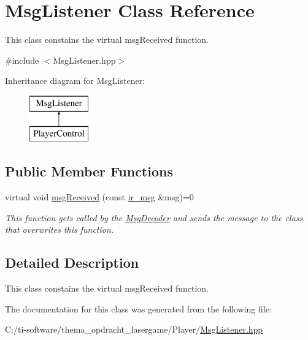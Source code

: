 \hypertarget{class_msg_listener}{}\section{Msg\+Listener Class Reference}
\label{class_msg_listener}


This class constains the virtual msg\+Received function.  




{\ttfamily \#include $<$Msg\+Listener.\+hpp$>$}

Inheritance diagram for Msg\+Listener\+:\begin{figure}[H]
\begin{center}
\leavevmode
\includegraphics[height=2.000000cm]{class_msg_listener}
\end{center}
\end{figure}
\subsection*{Public Member Functions}
\begin{DoxyCompactItemize}
\item 
\mbox{\label{class_msg_listener_a3bc48941e56b25199de434548513fd06}} 
virtual void \mbox{\hyperlink{class_msg_listener_a3bc48941e56b25199de434548513fd06}{msg\+Received}} (const \mbox{\hyperlink{structir__msg}{ir\+\_\+msg}} \&msg)=0
\begin{DoxyCompactList}\small\item\em This function gets called by the \mbox{\hyperlink{class_msg_decoder}{Msg\+Decoder}} and sends the message to the class that overwrites this function. \end{DoxyCompactList}\end{DoxyCompactItemize}


\subsection{Detailed Description}
This class constains the virtual msg\+Received function. 

The documentation for this class was generated from the following file\+:\begin{DoxyCompactItemize}
\item 
C\+:/ti-\/software/thema\+\_\+opdracht\+\_\+lasergame/\+Player/\mbox{\hyperlink{_msg_listener_8hpp}{Msg\+Listener.\+hpp}}\end{DoxyCompactItemize}
